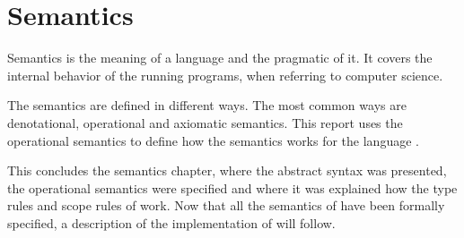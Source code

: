 \chapter{Semantics}\label{chap:semantics}
Semantics is the meaning of a language and the pragmatic of it. It covers the internal behavior of the running programs, when referring to computer science.

The semantics are defined in different ways. The most common ways are denotational, operational and axiomatic semantics. This report uses the operational semantics to define how the semantics works for the language \lang{}.








This concludes the semantics chapter, where the abstract syntax was presented, the operational semantics were specified and where it was explained how the type rules and scope rules of \lang{} work. 
Now that all the semantics of \lang{} have been formally specified, a description of the implementation of \lang{} will follow.
